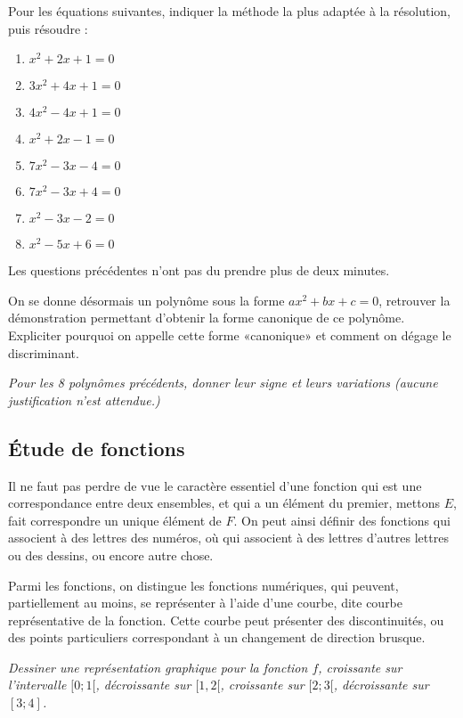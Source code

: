 \documentclass[a4paper,12pt,french]{article}
\begin{document}
Pour les équations suivantes, indiquer la méthode la plus adaptée à la
résolution, puis résoudre :
\begin{multicols}{4}
  \begin{enumerate}
    \item $x^2 + 2x + 1 = 0$
    \item $3x^2 + 4x + 1 = 0$
    \item $4x^2 - 4x + 1 = 0$
    \item $x^2 + 2x -1 =0$
    \item $7x^2 -3x -4 =0$
    \item $7x^2 -3x +4 =0$
    \item $x^2 - 3x -2 =0$
    \item $x^2 - 5x + 6 =0$
  \end{enumerate}
\end{multicols}
Les questions précédentes n'ont pas du prendre plus de deux minutes.

On se donne désormais un polynôme sous la forme $ax^2 + bx +c =0$,
retrouver la démonstration permettant d'obtenir la forme canonique de ce
polynôme. Expliciter pourquoi on appelle cette forme «canonique» et
comment on dégage le discriminant.

\emph{Pour les 8 polynômes précédents, donner leur signe et leurs
variations (aucune justification n'est attendue.)}

\subsection{Étude de fonctions}

Il ne faut pas perdre de vue le caractère essentiel d'une fonction qui
est une correspondance entre deux ensembles, et qui a un élément du
premier, mettons $E$, fait correspondre un unique élément de $F$. On
peut ainsi définir des fonctions qui associent à des lettres des
numéros, où qui associent à des lettres d'autres lettres ou des dessins,
ou encore autre chose.

Parmi les fonctions, on distingue les fonctions numériques, qui peuvent,
partiellement au moins, se représenter à l'aide d'une courbe, dite
courbe représentative de la fonction. Cette courbe peut présenter des
discontinuités, ou des points particuliers correspondant à un
changement de direction brusque.

\emph{Dessiner une représentation graphique pour la fonction $f$,
  croissante sur l'intervalle $[0;1[$, décroissante sur $[1,2[$,
croissante sur $[2;3[$, décroissante sur $[3;4]$.}
\end{document}
